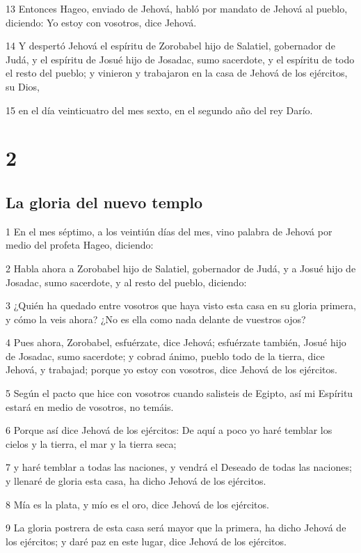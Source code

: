 \par 13 Entonces Hageo, enviado de Jehová, habló por mandato de Jehová al pueblo, diciendo: Yo estoy con vosotros, dice Jehová.
\par 14 Y despertó Jehová el espíritu de Zorobabel hijo de Salatiel, gobernador de Judá, y el espíritu de Josué hijo de Josadac, sumo sacerdote, y el espíritu de todo el resto del pueblo; y vinieron y trabajaron en la casa de Jehová de los ejércitos, su Dios,
\par 15 en el día veinticuatro del mes sexto, en el segundo año del rey Darío.

\chapter{2}

\section*{La gloria del nuevo templo}

\par 1 En el mes séptimo, a los veintiún días del mes, vino palabra de Jehová por medio del profeta Hageo, diciendo:
\par 2 Habla ahora a Zorobabel hijo de Salatiel, gobernador de Judá, y a Josué hijo de Josadac, sumo sacerdote, y al resto del pueblo, diciendo:
\par 3 ¿Quién ha quedado entre vosotros que haya visto esta casa en su gloria primera, y cómo la veis ahora? ¿No es ella como nada delante de vuestros ojos?
\par 4 Pues ahora, Zorobabel, esfuérzate, dice Jehová; esfuérzate también, Josué hijo de Josadac, sumo sacerdote; y cobrad ánimo, pueblo todo de la tierra, dice Jehová, y trabajad; porque yo estoy con vosotros, dice Jehová de los ejércitos.
\par 5 Según el pacto que hice con vosotros cuando salisteis de Egipto, así mi Espíritu estará en medio de vosotros, no temáis.
\par 6 Porque así dice Jehová de los ejércitos: De aquí a poco yo haré temblar los cielos y la tierra, el mar y la tierra seca;
\par 7 y haré temblar a todas las naciones, y vendrá el Deseado de todas las naciones; y llenaré de gloria esta casa, ha dicho Jehová de los ejércitos.
\par 8 Mía es la plata, y mío es el oro, dice Jehová de los ejércitos.
\par 9 La gloria postrera de esta casa será mayor que la primera, ha dicho Jehová de los ejércitos; y daré paz en este lugar, dice Jehová de los ejércitos.

